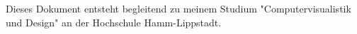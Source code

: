 %                                                                              
%                                                                              

Dieses Dokument entsteht begleitend zu meinem Studium "Computervisualistik und Design" an der Hochschule Hamm-Lippstadt.